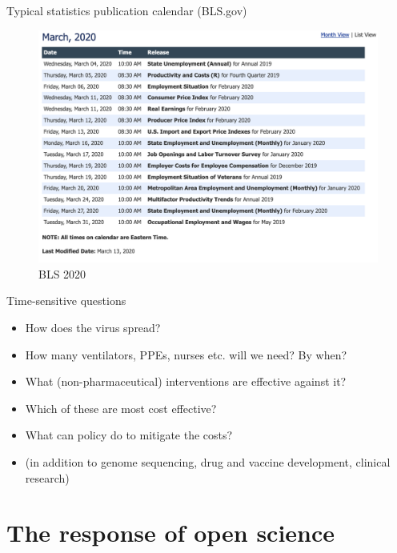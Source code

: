 \documentclass[
  ignorenonframetext,
  aspectratio=54,
]{beamer}
\providecommand{\tightlist}{%
  \setlength{\itemsep}{0pt}\setlength{\parskip}{0pt}}
\begin{document}
\begin{frame}{Typical statistics publication calendar (BLS.gov)}
\protect\hypertarget{typical-statistics-publication-calendar-bls.gov}{}
\begin{figure}
\centering
\includegraphics{exhibit/fig/bls-march-2020.png}
\caption{BLS 2020}
\end{figure}
\end{frame}

\begin{frame}{Time-sensitive questions}
\protect\hypertarget{time-sensitive-questions}{}
\begin{itemize}
\tightlist
\item
  How does the virus spread?
\item
  How many ventilators, PPEs, nurses etc. will we need? By when?
\item
  What (non-pharmaceutical) interventions are effective against it?
\item
  Which of these are most cost effective?
\item
  What can policy do to mitigate the costs?
\item
  (in addition to genome sequencing, drug and vaccine development,
  clinical research)
\end{itemize}
\end{frame}

\hypertarget{the-response-of-open-science}{%
\section{The response of open
science}\label{the-response-of-open-science}}
\end{document}
